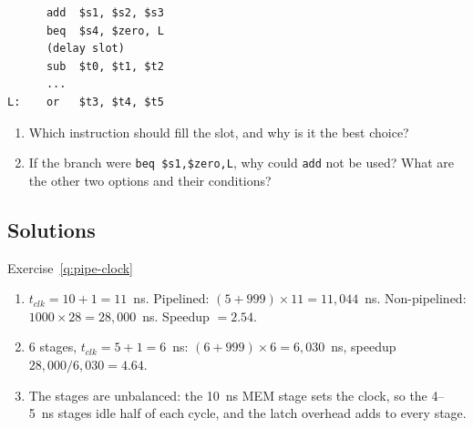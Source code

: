 \begin{exercise}\label{q:pipe-slot}
\leavevmode
\begin{lstlisting}
      add  $s1, $s2, $s3
      beq  $s4, $zero, L
      (delay slot)
      sub  $t0, $t1, $t2
      ...
L:    or   $t3, $t4, $t5
\end{lstlisting}
\begin{enumerate}[label=(\alph*),leftmargin=*]
  \item Which instruction should fill the slot, and why is it the best choice?
  \item If the branch were \texttt{beq \$s1,\$zero,L}, why could \texttt{add} not
  be used? What are the other two options and their conditions?
\end{enumerate}
\end{exercise}

\subsection{Solutions}
\label{sec:pipe-sol}

\begin{noot}{Exercise~\ref{q:pipe-clock}}
\begin{enumerate}[label=(\alph*),leftmargin=*]
  \item $t_{clk}=10+1=11$~ns. Pipelined: $(5+999)\times11=11{,}044$~ns.
  Non-pipelined: $1000\times28=28{,}000$~ns. Speedup $=2.54$.
  \item 6 stages, $t_{clk}=5+1=6$~ns: $(6+999)\times6=6{,}030$~ns, speedup
  $28{,}000/6{,}030=4.64$.
  \item The stages are unbalanced: the 10~ns MEM stage sets the clock, so the
  4--5~ns stages idle half of each cycle, and the latch overhead adds to every
  stage.
\end{enumerate}
\end{noot}

